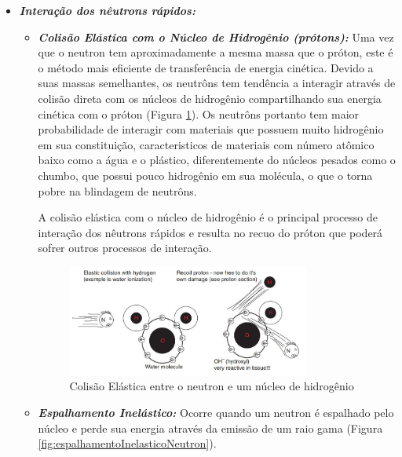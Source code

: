 \documentclass[11pt,a4paper]{article}
\begin{document}
            \begin{itemize}
                \item \textbf{\textit{\textcolor{CarnationPink}{Interação dos nêutrons rápidos}:}} 
                
                    \begin{itemize}
                        \item \textbf{\textit{\textcolor{CarnationPink}{Colisão Elástica com o Núcleo de Hidrogênio (prótons)}:}} Uma vez que o neutron tem aproximadamente a mesma massa que o próton, este é o método mais eficiente de transferência de energia cinética. Devido a suas massas semelhantes, os neutrôns tem tendência a interagir através de colisão direta com os núcleos de hidrogênio compartilhando sua energia cinética com o próton (Figura \ref{fig:colisaoElasticaNeutronProton}). Os neutrôns portanto tem maior probabilidade de interagir com materiais que possuem muito hidrogênio em sua constituição, caracteristicos de materiais com número atômico baixo como a água e o plástico, diferentemente do núcleos pesados como o chumbo, que possui pouco hidrogênio em sua molécula, o que o torna pobre na blindagem de neutrôns. 
                        
                        A colisão elástica com o núcleo de hidrogênio é o principal processo de interação dos nêutrons rápidos e resulta no recuo do próton que poderá sofrer outros processos de interação. 

                            \begin{figure}[h]
                                \centering
                                \includegraphics[width=0.8\textwidth]{Imagens/colisaoElasticaNeutronProton.JPG}
                                \caption{Colisão Elástica entre o neutron e um núcleo de hidrogênio}
                                \label{fig:colisaoElasticaNeutronProton}                
                            \end{figure}

                        \item \textbf{\textit{\textcolor{CarnationPink}{Espalhamento Inelástico}:}} Ocorre quando um neutron é espalhado pelo núcleo e perde sua energia através da emissão de um raio gama (Figura \ref{fig:espalhamentoInelasticoNeutron}). 
                        

\end{itemize}
\end{itemize}
\end{document}
